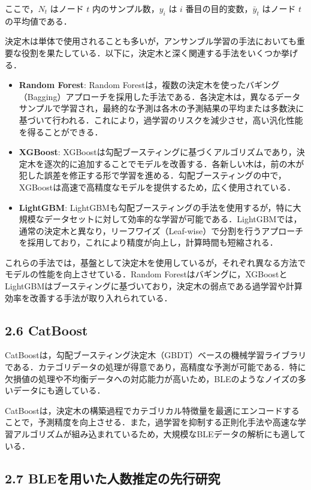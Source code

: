 ここで，$N_t$ はノード $t$ 内のサンプル数，$y_i$ は $i$ 番目の目的変数，$\bar{y}_t$ はノード $t$ の平均値である．


決定木は単体で使用されることも多いが，アンサンブル学習の手法においても重要な役割を果たしている．以下に，決定木と深く関連する手法をいくつか挙げる．

\begin{itemize}
	\item \textbf{Random Forest}: 
	Random Forestは，複数の決定木を使ったバギング（Bagging）アプローチを採用した手法である．各決定木は，異なるデータサンプルで学習され，最終的な予測は各木の予測結果の平均または多数決に基づいて行われる．これにより，過学習のリスクを減少させ，高い汎化性能を得ることができる．
	
	\item \textbf{XGBoost}:
	XGBoostは勾配ブースティングに基づくアルゴリズムであり，決定木を逐次的に追加することでモデルを改善する．各新しい木は，前の木が犯した誤差を修正する形で学習を進める．勾配ブースティングの中で，XGBoostは高速で高精度なモデルを提供するため，広く使用されている．
	
	\item \textbf{LightGBM}:
	LightGBMも勾配ブースティングの手法を使用するが，特に大規模なデータセットに対して効率的な学習が可能である．LightGBMでは，通常の決定木と異なり，リーフワイズ（Leaf-wise）で分割を行うアプローチを採用しており，これにより精度が向上し，計算時間も短縮される．
\end{itemize}

これらの手法では，基盤として決定木を使用しているが，それぞれ異なる方法でモデルの性能を向上させている．Random Forestはバギングに，XGBoostとLightGBMはブースティングに基づいており，決定木の弱点である過学習や計算効率を改善する手法が取り入れられている．

\subsection*{2.6 CatBoost}
CatBoostは，勾配ブースティング決定木（GBDT）ベースの機械学習ライブラリである．カテゴリデータの処理が得意であり，高精度な予測が可能である．特に欠損値の処理や不均衡データへの対応能力が高いため，BLEのようなノイズの多いデータにも適している．

CatBoostは，決定木の構築過程でカテゴリカル特徴量を最適にエンコードすることで，予測精度を向上させる．また，過学習を抑制する正則化手法や高速な学習アルゴリズムが組み込まれているため，大規模なBLEデータの解析にも適している．

\subsection*{2.7 BLEを用いた人数推定の先行研究}

